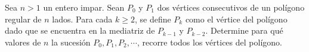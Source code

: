 Sea $n > 1$ un entero impar. Sean $P_0$ y $P_1$ dos vértices consecutivos de un polígono regular de $n$ lados. Para cada $k \geq 2$, se define $P_k$ como el vértice del polígono dado que se encuentra en la mediatriz de $P_{k-1}$ y $P_{k-2}$. Determine para qué valores de $n$ la sucesión $P_0, P_1, P_2, \cdots$, recorre todos los vértices del polígono.
